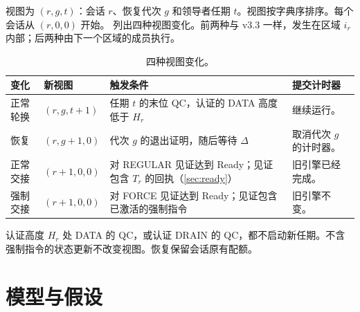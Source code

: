 \documentclass[11pt,a4paper]{article}
\begin{document}
视图为 $(r,g,t)$：会话 $r$、恢复代次 $g$ 和领导者任期 $t$。视图按字典序排序。每个会话从 $(r,0,0)$ 开始。 列出四种视图变化。前两种与 v3.3 一样，发生在区域 $i_r$ 内部；后两种由下一个区域的成员执行。
\begin{table}[htbp]\centering\small
\caption{四种视图变化。}\label{tab:views}
\begin{tabularx}{\linewidth}{@{}p{.16\linewidth}p{.17\linewidth}Y p{.22\linewidth}@{}}
\toprule
变化 & 新视图 & 触发条件 & 提交计时器\\\midrule
正常轮换 & $(r,g,t+1)$ & 任期 $t$ 的末位 QC，认证的 DATA 高度低于 $H_r$ & 继续运行。\\
恢复 & $(r,g+1,0)$ & 代次 $g$ 的退出证明，随后等待 $\Delta$ & 取消代次 $g$ 的计时器。\\
正常交接 & $(r+1,0,0)$ & 对 REGULAR 见证达到 Ready；见证包含 $T_r$ 的回执（\cref{sec:ready}） & 旧引擎已经完成。\\
强制交接 & $(r+1,0,0)$ & 对 FORCE 见证达到 Ready；见证包含已激活的强制指令 & 旧引擎不变。\\\bottomrule
\end{tabularx}
\end{table}
认证高度 $H_r$ 处 DATA 的 QC，或认证 DRAIN 的 QC，都不启动新任期。不含强制指令的状态更新不改变视图。恢复保留会话原有配额。

\section{模型与假设}\label{sec:model}
\end{document}
